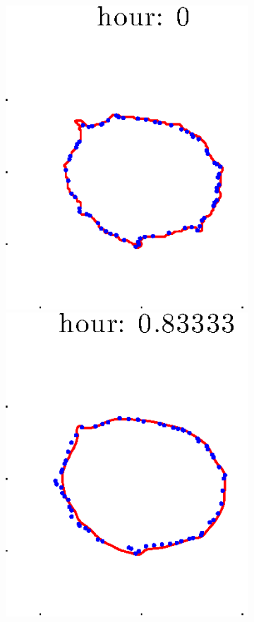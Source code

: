 \documentclass[12pt]{article}
\begin{document}
\begin{figure}[h!]
\begin{subfigure}[b]{.3\textwidth}
	\end{subfigure}
	\begin{subfigure}[b]{.3\textwidth}
	\centering
		\includegraphics[height=.15\textheight]{Pos10exp2/secondhalf/first1.eps}
		\includegraphics[height=.15\textheight]{Pos10exp2/secondhalf/first2.eps}

\end{subfigure}
\end{figure}
\end{document}
